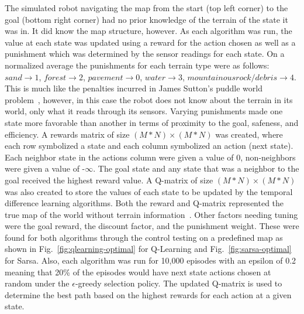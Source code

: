 \documentclass[12pt,american]{report}
\begin{document}
The simulated robot navigating the map from the start (top left corner) to the goal (bottom right corner) had no prior knowledge of the terrain of the state it was in.  It did know the map structure, however.  As each algorithm was run, the value at each state was updated using a reward for the action chosen as well as a punishment which was determined by the sensor readings for each state. On a normalized average the punishments for each terrain type were as follows: $sand \rightarrow 1$, $forest \rightarrow 2$, $pavement \rightarrow 0$, $water \rightarrow 3$, $mountainous rock/debris \rightarrow 4$. This is much like the penalties incurred in James Sutton's puddle world problem~\cite{sutton1996generalization}, however, in this case the robot does not know about the terrain in its world, only what it reads through its sensors. Varying punishments made one state more favorable than another in terms of proximity to the goal, safeness, and efficiency. A rewards matrix of size $(M*N) \times (M*N)$ was created, where each row symbolized a state and each column symbolized an action (next state).  Each neighbor state in the actions column were given a value of 0, non-neighbors were given a value of -\begin{math}\infty\end{math}. The goal state and any state that was a neighbor to the goal received the highest reward value.  A Q-matrix of size $(M*N) \times (M*N)$ was also created to store the values of each state to be updated by the temporal difference learning algorithms. Both the reward and Q-matrix represented the true map of the world without terrain information~\cite{tutorial}. Other factors needing tuning were the goal reward, the discount factor, and the punishment weight.  These were found for both algorithms through the control testing on a predefined map as shown in Fig.~\ref{fig:qlearning-optimal} for Q-Learning and Fig.~\ref{fig:sarsa-optimal} for Sarsa. Also, each algorithm was run for 10,000 episodes with an epsilon of 0.2 meaning that 20\% of the episodes would have next state actions chosen at random under the \begin{math}\epsilon\end{math}-greedy selection policy. The updated Q-matrix is used to determine the best path based on the highest rewards for each action at a given state.
\end{document}
